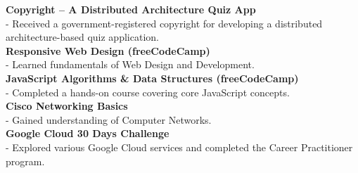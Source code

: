 \documentclass[a4paper,10pt]{article}
\begin{document}
\textbf{Copyright – A Distributed Architecture Quiz App} \\
- Received a government-registered copyright for developing a distributed architecture-based quiz application. \\[1ex]
\textbf{Responsive Web Design (freeCodeCamp)} \\
- Learned fundamentals of Web Design and Development. \\[1ex]
\textbf{JavaScript Algorithms \& Data Structures (freeCodeCamp)} \\
- Completed a hands-on course covering core JavaScript concepts. \\[1ex]
\textbf{Cisco Networking Basics} \\
- Gained understanding of Computer Networks. \\[1ex]
\textbf{Google Cloud 30 Days Challenge} \\
- Explored various Google Cloud services and completed the Career Practitioner program. \\[1ex]


\vfill
{}
\end{document}
